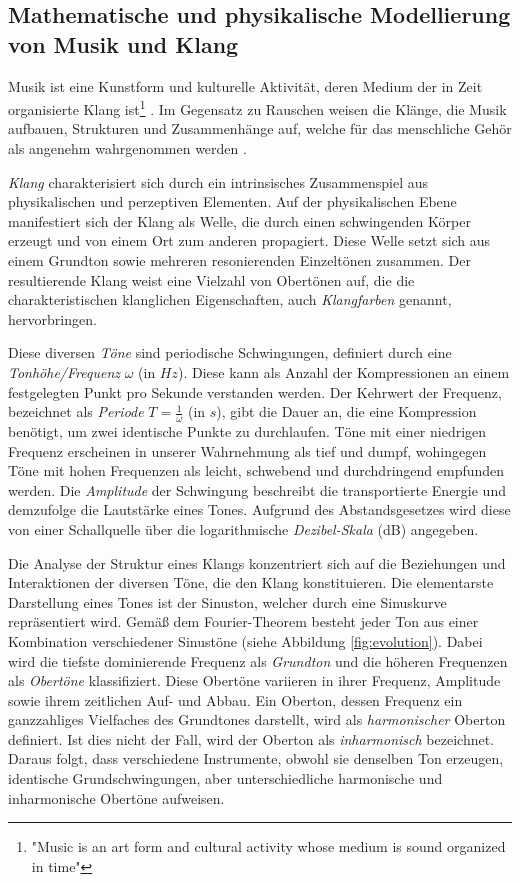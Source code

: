 \documentclass[
  a4paper,  %
  twoside,  %
  bibliography=totoc,
  headsepline,
  cleardoublepage=empty,
  parskip=half,
  draft=false
]{scrbook}
\begin{document}
\subsection{Mathematische und physikalische Modellierung von Musik und Klang}\label{sec:music_math}
\glqq Musik ist eine Kunstform und kulturelle Aktivität, deren Medium der in Zeit organisierte Klang ist\grqq \footnote{"Music is an art form and cultural activity whose medium is sound organized in time"} \cite{tsuji_physics_2021}. Im Gegensatz zu Rauschen weisen die Klänge, die Musik aufbauen, Strukturen und Zusammenhänge auf, welche für das menschliche Gehör als angenehm wahrgenommen werden \cite{parker_good_2009}. 

\emph{Klang} charakterisiert sich durch ein intrinsisches Zusammenspiel aus physikalischen und perzeptiven Elementen. Auf der physikalischen Ebene manifestiert sich der Klang als Welle, die durch einen schwingenden Körper erzeugt und von einem Ort zum anderen propagiert. Diese Welle setzt sich aus einem Grundton sowie mehreren resonierenden Einzeltönen zusammen. Der resultierende Klang weist eine Vielzahl von Obertönen auf, die die charakteristischen klanglichen Eigenschaften, auch \emph{Klangfarben} genannt, hervorbringen. \cite{tsuji_physics_2021, parker_good_2009}

Diese diversen \emph{Töne} sind periodische Schwingungen, definiert durch eine \emph{Tonhöhe/Frequenz} $\omega$ (in $Hz$). Diese kann als Anzahl der Kompressionen an einem festgelegten Punkt pro Sekunde verstanden werden. Der Kehrwert der Frequenz, bezeichnet als \emph{Periode} $T=\frac{1}{\omega}$ (in $s$), gibt die Dauer an, die eine Kompression benötigt, um zwei identische Punkte zu durchlaufen. Töne mit einer niedrigen Frequenz erscheinen in unserer Wahrnehmung als tief und dumpf, wohingegen Töne mit hohen Frequenzen als leicht, schwebend und durchdringend empfunden werden. Die \emph{Amplitude} der Schwingung beschreibt die transportierte Energie und demzufolge die Lautstärke eines Tones. Aufgrund des Abstandsgesetzes wird diese von einer Schallquelle über die logarithmische \emph{Dezibel-Skala} (dB) angegeben. \cite{tsuji_physics_2021, parker_good_2009}

Die Analyse der Struktur eines Klangs konzentriert sich auf die Beziehungen und Interaktionen der diversen Töne, die den Klang konstituieren. Die elementarste Darstellung eines Tones ist der Sinuston, welcher durch eine Sinuskurve repräsentiert wird. Gemäß dem Fourier-Theorem besteht jeder Ton aus einer Kombination verschiedener Sinustöne (siehe Abbildung \ref{fig:evolution}). Dabei wird die tiefste dominierende Frequenz als \emph{Grundton} und die höheren Frequenzen als \emph{Obertöne} klassifiziert. Diese Obertöne variieren in ihrer Frequenz, Amplitude sowie ihrem zeitlichen Auf- und Abbau. Ein Oberton, dessen Frequenz ein ganzzahliges Vielfaches des Grundtones darstellt, wird als \emph{harmonischer} Oberton definiert. Ist dies nicht der Fall, wird der Oberton als \emph{inharmonisch} bezeichnet. Daraus folgt, dass verschiedene Instrumente, obwohl sie denselben Ton erzeugen, identische Grundschwingungen, aber unterschiedliche harmonische und inharmonische Obertöne aufweisen. \cite{parker_good_2009, white_physics_2014, ruschkowski_elektronische_2019}
\end{document}
